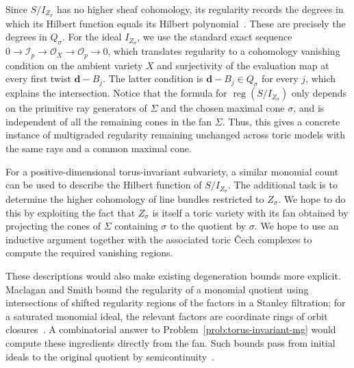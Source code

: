 \documentclass[11pt,reqno]{amsart}
\theoremstyle{remark}
\newcommand{\reg}{\operatorname{reg}}
\newcommand{\dd}{\mathbf{d}}
\newcommand{\cI}{\mathcal{I}}
\newcommand{\cO}{\mathcal{O}}
\begin{document}
Since $S/I_{Z_{\sigma}}$ has no higher sheaf cohomology, its regularity records the degrees in which its Hilbert function equals its Hilbert polynomial~\cite[Proposition~6.4]{maclaganSmith04}. These are precisely the degrees in $Q_{\sigma}$. For the ideal $I_{Z_\sigma}$, we use the standard exact sequence $0\to\cI_p\to\cO_X\to\cO_p\to0$, which translates regularity to a cohomology vanishing condition on the ambient variety $X$ and surjectivity of the evaluation map at every first twist $\dd-B_j$. The latter condition is $\dd-B_j\in Q_\sigma$ for every $j$, which explains the intersection. Notice that the formula for $\reg(S/I_{Z_\sigma})$ only depends on the primitive ray generators of $\Sigma$ and the chosen maximal cone $\sigma$, and is independent of all the remaining cones in the fan $\Sigma$. Thus, this gives a concrete instance of multigraded regularity remaining unchanged across toric models with the same rays and a common maximal cone.

For a positive-dimensional torus-invariant subvariety, a similar monomial count can be used to describe the Hilbert function of $S/I_{Z_\sigma}$. The additional task is to determine the higher cohomology of line bundles restricted to $Z_{\sigma}$. We hope to do this by exploiting the fact that $Z_{\sigma}$ is itself a toric variety with its fan obtained by projecting the cones of $\Sigma$ containing $\sigma$ to the quotient by $\sigma$. We hope to use an inductive argument together with the associated toric \v{C}ech complexes to compute the required vanishing regions.

These descriptions would also make existing degeneration bounds more explicit. Maclagan and Smith bound the regularity of a monomial quotient using intersections of shifted regularity regions of the factors in a Stanley filtration; for a saturated monomial ideal, the relevant factors are coordinate rings of orbit closures~\cite[Theorem~4.1]{maclaganSmith05}. A combinatorial answer to Problem~\ref{prob:torus-invariant-mg} would compute these ingredients directly from the fan. Such bounds pass from initial ideals to the original quotient by semicontinuity~\cite[Proposition~6.13]{maclaganSmith04}.

\end{document}
